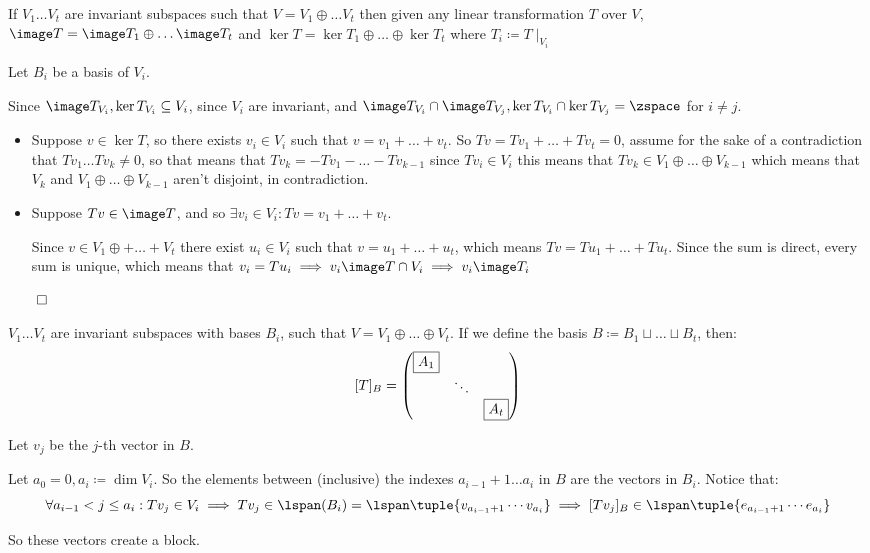 \documentclass[10pt]{article}
\begin{document}
\begin{lemma*}{If $V_1\dots V_t$ are invariant subspaces such that $V=V_1\oplus\dots V_t$ then given any linear transformation $T$ over $V$, $\image T = \image T_1\oplus\dots\image T_t$ and $\ker T=\ker T_1\oplus\dots\oplus\ker T_t$ where $T_i\coloneqq T\mid_{V_i}$}

Let $B_i$ be a basis of $V_i$.

Since $\image T_{V_i}, \ker T_{V_i} \subseteq V_i$, since $V_i$ are invariant, and $\image T_{V_i}\cap\image T_{V_j}, \ker T_{V_i}\cap\ker T_{V_j} = \zspace$ for $i\neq j$.

\begin{itemize}
\item Suppose $v\in\ker T$, so there exists $v_i\in V_i$ such that $v=v_1+\dots+v_t$. So $Tv = Tv_1+\dots+Tv_t=0$, assume for the sake of a contradiction that $Tv_1\dots Tv_k\neq0$, so that means that $Tv_k=-Tv_1-\dots-Tv_{k-1}$ since $Tv_i\in V_i$ this means that $Tv_k\in V_1\oplus\dots\oplus V_{k-1}$ which means that $V_k$ and $V_1\oplus\dots\oplus V_{k-1}$ aren't disjoint, in contradiction.

\item Suppose $Tv\in\image T$, and so $\exists v_i\in V_i: Tv=v_1+\dots+v_t$.

Since $v\in V_1\oplus+\dots+V_t$ there exist $u_i\in V_i$ such that $v=u_1+\dots+u_t$, which means $Tv=Tu_1+\dots+Tu_t$. Since the sum is direct, every sum is unique, which means that $v_i=Tu_i\implies v_i\image T\cap V_i\implies v_i\image T_i$

\end{itemize}

$\qed$

\end{lemma*}

\begin{lemma}[matInvarRepLemma]{$V_1\dots V_t$ are invariant subspaces with bases $B_i$, such that $V=V_1\oplus\dots\oplus V_t$. If we define the basis $B\coloneqq B_1\sqcup\dots\sqcup B_t$, then:
\[ [T]_B = \begin{pmatrix} \fbox{$A_1$} & & \\ & \ddots & \\ & & \fbox{$A_t$} \end{pmatrix} \] }

Let $v_j$ be the $j$-th vector in $B$.

Let $a_0=0, a_i \coloneqq \dim V_i$. So the elements between (inclusive) the indexes $a_{i-1}+1\dots a_i$ in $B$ are the vectors in $B_i$. Notice that:
\[ \forall a_{i-1} < j \leq a_i : Tv_j \in V_i \implies Tv_j\in\lspan(B_i) = \lspan\tuple{v_{a_{i-1}+1}\cdots v_{a_i}} \implies [Tv_j]_B \in \lspan\tuple{e_{a_{i-1}+1}\cdots e_{a_i}} \]

So these vectors create a block.

\end{lemma}
\end{document}
